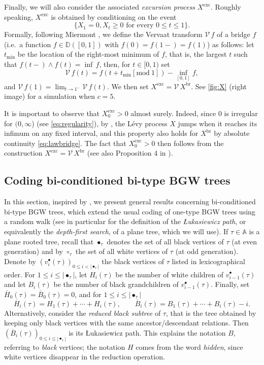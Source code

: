 \documentclass[AHL,XML,longabstracts,Unicode]{cedram}
\providecommand{\abs}[1]{\lvert#1\rvert}
\newcommand{\D}{\mathbb{D}}
\def\oB{\overline{B}}
\def\oH{\overline{H}}
\def \Xexc{X^{\mathrm{exc}}}
\def \Xbr{X^{\mathrm{br}}}
\begin{document}
 Finally, we will also consider the associated \emph{excursion process} $\Xexc$.
Roughly speaking, $\Xexc$   is obtained by conditioning on the event
\[\{X_{1}=0, X_{t} \geq 0 \textrm{ for every } 0 \leq t \leq 1\}.\]
Formally, following Miermont \cite[Definition~1]{Mie01}, we define the Vervaat transform $\mathcal V\, f$ of a bridge $f$
(i.e.\ a function $f \in \D([0,1])$ with $f(0)=f(1-)=f(1)$) as follows:
let $t_{\min}$ be the location of the right-most minimum of $f$, that is, the largest $t$ such
that $f(t-) \wedge f (t) = \inf\, f$, then, for $t \in [0,1)$ set
\[\mathcal V\, f (t) =f(t + t_{\min} [\mathrm{mod}\ 1]) - \inf_{[0,1]} f, \]
and $\mathcal V\, f (1) = \lim_{t \to 1^-} \mathcal V\, f (t)$.
We then set $\Xexc= \mathcal V\, \Xbr$.
See \cref{fig:X} (right image) for a simulation  when $c=5$.

It is important to observe that $\Xexc_{0}>0$ almost surely. Indeed, since $0$ is irregular for $(0,\infty$) (see \eqref{eq:regularity}), by \cite[Theorem 3.1 (b)]{Mil77}, the L\'evy process $X$ jumps when it reaches its infimum on any fixed interval, and this property also holds for $\Xbr$ by absolute continuity \eqref{eq:lawbridge}.  The fact that $\Xexc_{0}>0$ then follows from the construction $\Xexc= \mathcal V\, \Xbr$ (see also Proposition 4 in \cite{Mie01}).





\subsection{Coding bi-conditioned bi-type BGW trees}
\label{ss:coding}


In this section, inspired by \cite{CL16}, we present general results concerning  bi-conditioned bi-type BGW trees, which extend the usual coding of one-type BGW trees using a random walk (see in particular \cite[Sec.~1.1]{LG05} for the definition of the  \emph{{\L}ukasiewicz path}, or equivalently the \emph{depth-first search}, of a plane tree, which we will use).  If $\tau \in \mathbb{A}$ is a plane rooted  tree,  recall that $\bullet_{\tau}$ denotes the set  of all black vertices of $\tau$ (at even generation) and by  $\circ_{\tau}$ the set of all white vertices of $\tau$ (at odd generation). Denote by $(v^{\bullet}_{i}(\tau))_{0 \leq i < \abs{\bullet_{\tau}}} $ the black vertices of $\tau$ listed in lexicographical order.  For $1 \leq i \leq \abs{\bullet_{\tau}}$, let $H_{i}(\tau)$ be the number of white children of $v^{\bullet}_{i-1}(\tau)$ and let $B_{i}(\tau)$ be the number of black grandchildren of $v^{\bullet}_{i-1}(\tau)$. Finally,  set $\oH_{0}(\tau)=\oB_{0}(\tau)=0$, and for $1 \leq i \leq \abs{\bullet_{\tau}}$
\[\oH_{i}(\tau)=H_{1}(\tau)+ \cdots+H_{i}(\tau), \qquad  \oB_{i}(\tau)=B_{1}(\tau)+ \cdots+B_{i}(\tau)-i.\]
Alternatively, consider the \emph{reduced black subtree} of $\tau$, that is the tree obtained by keeping only black vertices
with the same ancestor/descendant relations.
Then $(\overline{B}_i(\tau))_{0 \le i \le |\bullet_\tau|}$ is its {\L}ukasiewicz path.
This explains the notation $B$, referring to {\em black} vertices;
the notation $H$ comes from the word \emph{hidden},
since white vertices disappear in the reduction operation.
\end{document}
